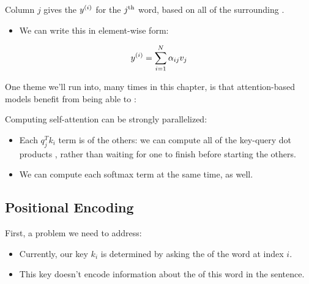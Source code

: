         Column $j$ gives the  $y^{(i)}$ for the $j^{ \text{th} }$ word, based on all of the surrounding . 

        \begin{itemize}
            \item We can write this in element-wise form:
        \end{itemize}

        $$y^{(i)} = \sum_{i=1}^N \alpha_{ij} v_j$$

        One theme we'll run into, many times in this chapter, is that attention-based models benefit from being able to :\\

        \begin{concept}
        
            Computing self-attention can be strongly parallelized:

            \begin{itemize}
                \item Each $q_j^Tk_i$ term is  of the others: we can compute all of the key-query dot products , rather than waiting for one to finish before starting the others.
                \item We can compute each softmax term at the same time, as well.
            \end{itemize}
        \end{concept}



\pagebreak

\subsection{Positional Encoding}

    First, a problem we need to address:

    \begin{itemize}
        \item Currently, our key $k_i$ is determined by asking the  of the word at index $i$.

        \item This key doesn't encode information about the  of this word in the sentence.
    \end{itemize}

